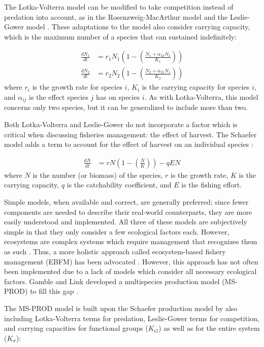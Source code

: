 \documentclass{article}
\begin{document}
The Lotka-Volterra model can be modified to take competition instead of predation into account, as in the Rosenzweig-MacArthur model \cite{Rosenzweig1963Graphical} and the Leslie-Gower model \cite{leslie1960}.  These adaptations to the model also consider carrying capacity, which is the maximum number of a species that can sustained indefinitely:

\begin{align}
   \frac{d N_1}{dt} &= r_1 N_1 \left(1 - \left(\frac{N_1 + \alpha_{12} N_2}{K_1}\right)\right)
\\ \frac{d N_2}{dt} &= r_2 N_2 \left(1 - \left(\frac{N_2 + \alpha_{21} N_1}{K_2}\right)\right)
\end{align}
where $r_i$ is the growth rate for species $i$, $K_i$ is the carrying capacity for species $i$, and $\alpha_{ij}$ is the effect species $j$ has on species $i$.  As with Lotka-Volterra, this model concerns only two species, but it can be generalized to include more than two.

Both Lotka-Volterra and Leslie-Gower do not incorporate a factor which is critical when discussing fisheries management: the effect of harvest.  The Schaefer model adds a term to account for the effect of harvest on an individual species \cite{schaefer1957}:

\begin{align}
   \frac{d N}{dt} &= r N \left(1 - \left(\frac{N}{K}\right)\right) - q E N
\end{align}
where $N$ is the number (or biomass) of the species, $r$ is the growth rate, $K$ is the carrying capacity, $q$ is the catchability coefficient, and $E$ is the fishing effort.

Simple models, when available and correct, are generally preferred; since fewer components are needed to describe their real-world counterparts, they are more easily understood and implemented.  All three of these models are subjectively simple in that they only consider a few ecological factors each. However, ecosystems are complex systems which require management that recognizes them as such \cite{Christensen1996Report}.  Thus, a more holistic approach called ecosystem-based fishery management (EBFM) has been advocated \cite{united1999ecosystem}.  However, this approach has not often been implemented due to a lack of models which consider all necessary ecological factors.  Gamble and Link developed a multispecies production model (MS-PROD) to fill this gap \cite{Gamble20092570}.

The MS-PROD model is built upon the Schaefer production model by also including Lotka-Volterra terms for predation, Leslie-Gower terms for competition, and carrying capacities for functional groups ($K_G$) as well as for the entire system ($K_{\sigma}$):
\end{document}
